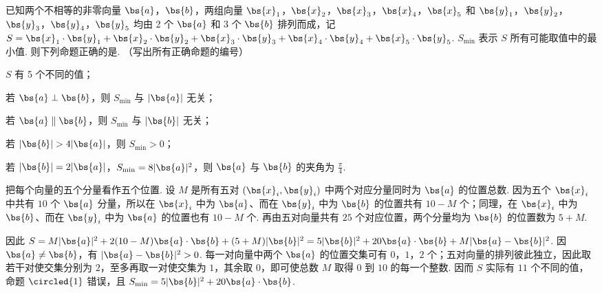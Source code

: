 \begin{problem}
已知两个不相等的非零向量 \(\bs{a}\)，\(\bs{b}\)，两组向量 \(\bs{x}_{1}\)，\(\bs{x}_{2}\)，\(\bs{x}_{3}\)，\(\bs{x}_{4}\)，\(\bs{x}_{5}\) 和 \(\bs{y}_{1}\)，\(\bs{y}_{2}\)，\(\bs{y}_{3}\)，\(\bs{y}_{4}\)，\(\bs{y}_{5}\) 均由 2 个 \(\bs{a}\) 和 3 个 \(\bs{b}\) 排列而成，记 \(S = \bs{x}_{1} \cdot \bs{y}_{1} + \bs{x}_{2} \cdot \bs{y}_{2} + \bs{x}_{3} \cdot \bs{y}_{3} + \bs{x}_{4} \cdot \bs{y}_{4} + \bs{x}_{5} \cdot \bs{y}_{5}\). \(S_{\min}\) 表示 \(S\) 所有可能取值中的最小值. 则下列命题正确的是\fillinblank{}. （写出所有正确命题的编号）

\begin{circlelist}
\item \(S\) 有 5 个不同的值；

\item 若 \(\bs{a} \perp \bs{b}\)，则 \(S_{\min}\) 与 \(|\bs{a}|\) 无关；

\item 若 \(\bs{a} \parallel \bs{b}\)，则 \(S_{\min}\) 与 \(|\bs{b}|\) 无关；

\item 若 \(|\bs{b}| > 4|\bs{a}|\)，则 \(S_{\min} > 0\)；

\item 若 \(|\bs{b}| = 2|\bs{a}|\)，\(S_{\min} = 8|\bs{a}|^2\)，则 \(\bs{a}\) 与 \(\bs{b}\) 的夹角为 \(\frac{\pi}{4}\).
\end{circlelist}

\begin{solution}
把每个向量的五个分量看作五个位置. 设 \(M\) 是所有五对 \((\bs{x}_i,\bs{y}_i)\) 中两个对应分量同时为 \(\bs{a}\) 的位置总数. 因为五个 \(\bs{x}_i\) 中共有 \(10\) 个 \(\bs{a}\) 分量，所以在 \(\bs{x}_i\) 中为 \(\bs{a}\)、而在 \(\bs{y}_i\) 中为 \(\bs{b}\) 的位置共有 \(10-M\) 个；同理，在 \(\bs{x}_i\) 中为 \(\bs{b}\)、而在 \(\bs{y}_i\) 中为 \(\bs{a}\) 的位置也有 \(10-M\) 个. 再由五对向量共有 \(25\) 个对应位置，两个分量均为 \(\bs{b}\) 的位置数为 \(5+M\).

因此 \(S=M\lvert\bs{a}\rvert^{2}+2(10-M)\bs{a}\cdot\bs{b}+(5+M)\lvert\bs{b}\rvert^{2}=5\lvert\bs{b}\rvert^{2}+20\bs{a}\cdot\bs{b}+M\lvert\bs{a}-\bs{b}\rvert^{2}\). 因 \(\bs{a}\neq\bs{b}\)，有 \(\lvert\bs{a}-\bs{b}\rvert^{2}>0\). 每一对向量中两个 \(\bs{a}\) 的位置交集可有 \(0\)，\(1\)，\(2\) 个；五对向量的排列彼此独立，因此取若干对使交集分别为 \(2\)，至多再取一对使交集为 \(1\)，其余取 \(0\)，即可使总数 \(M\) 取得 \(0\) 到 \(10\) 的每一个整数. 因而 \(S\) 实际有 \(11\) 个不同的值，命题 \(\circled{1}\) 错误，且 \(S_{\min}=5\lvert\bs{b}\rvert^{2}+20\bs{a}\cdot\bs{b}\).


\end{solution}
\end{problem}
